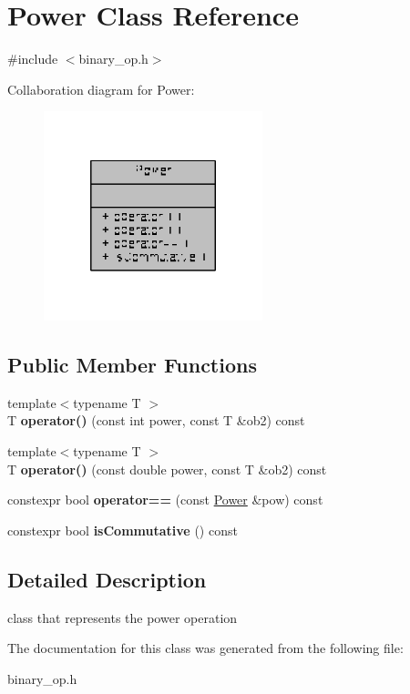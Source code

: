 \hypertarget{classPower}{\section{Power Class Reference}
\label{classPower}
}


{\ttfamily \#include $<$binary\-\_\-op.\-h$>$}



Collaboration diagram for Power\-:
\nopagebreak
\begin{figure}[H]
\begin{center}
\leavevmode
\includegraphics[width=180pt]{classPower__coll__graph}
\end{center}
\end{figure}
\subsection*{Public Member Functions}
\begin{DoxyCompactItemize}
\item 
\hypertarget{classPower_ac74736c78fda0ded1af34f2d18be6d7c}{{\footnotesize template$<$typename T $>$ }\\T {\bfseries operator()} (const int power, const T \&ob2) const }\label{classPower_ac74736c78fda0ded1af34f2d18be6d7c}

\item 
\hypertarget{classPower_affc1af2aa3d16ce7e859072bedf4d386}{{\footnotesize template$<$typename T $>$ }\\T {\bfseries operator()} (const double power, const T \&ob2) const }\label{classPower_affc1af2aa3d16ce7e859072bedf4d386}

\item 
\hypertarget{classPower_ac012a36dba75b435c6a531564a6c8d85}{constexpr bool {\bfseries operator==} (const \hyperlink{classPower}{Power} \&pow) const }\label{classPower_ac012a36dba75b435c6a531564a6c8d85}

\item 
\hypertarget{classPower_a78c80f5c9632baf5f91538d0fe6c249a}{constexpr bool {\bfseries is\-Commutative} () const }\label{classPower_a78c80f5c9632baf5f91538d0fe6c249a}

\end{DoxyCompactItemize}


\subsection{Detailed Description}
class that represents the power operation 

The documentation for this class was generated from the following file\-:\begin{DoxyCompactItemize}
\item 
binary\-\_\-op.\-h\end{DoxyCompactItemize}
